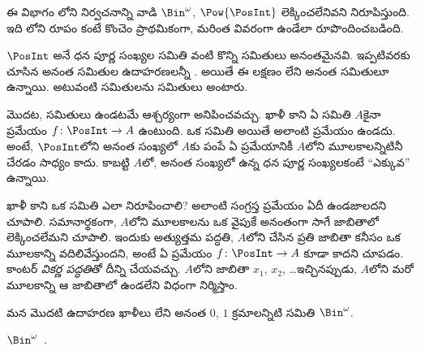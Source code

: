 \documentclass[../../../include/open-logic-section]{subfiles}
\begin{document}


\begin{editorial}
  ఈ విభాగం లోని నిర్వచనాన్ని వాడి $\Bin^\omega$,
  $\Pow{\PosInt}$ లెక్కించలేనివని నిరూపిస్తుంది. ఇది
  లోని రూపం కంటే కొంచెం ప్రాథమికంగా, మరింత
  వివరంగా ఉండేలా రూపొందించబడింది.
\end{editorial}

$\PosInt$ అనే ధన పూర్ణ సంఖ్యల సమితి వంటి కొన్ని సమితులు అనంతమైనవి.
ఇప్పటివరకు చూసిన అనంత సమితుల ఉదాహరణలన్నీ . అయితే ఈ
లక్షణం లేని అనంత సమితులూ ఉన్నాయి. అటువంటి సమితులను
\emph{} సమితులు అంటారు.

మొదట,  సమితులు ఉండటమే ఆశ్చర్యంగా అనిపించవచ్చు.
ఖాళీ కాని ఏ  సమితి $A$కైనా  ప్రమేయం
$f \colon \PosInt \to A$ ఉంటుంది. ఒక సమితి  అయితే
అలాంటి ప్రమేయం ఉండదు. అంటే, $\PosInt$లోని అనంత సంఖ్యలో
 $A$కు పంపే ఏ ప్రమేయానికీ $A$లోని మూలకాలన్నిటినీ చేరడం సాధ్యం కాదు.
కాబట్టి $A$లో, అనంత సంఖ్యలో ఉన్న ధన పూర్ణ సంఖ్యలకంటే ``ఎక్కువ''
 ఉన్నాయి.

ఖాళీ కాని ఒక సమితి  ఎలా నిరూపించాలి? అలాంటి సంగ్రస్త
ప్రమేయం ఏదీ ఉండజాలదని చూపాలి. సమానార్థకంగా, $A$లోని మూలకాలను ఒక
వైపుకే అనంతంగా సాగే జాబితాలో లెక్కించలేమని చూపాలి. ఇందుకు అత్యుత్తమ
పద్ధతి, $A$లోని  చేసిన ప్రతి జాబితా కనీసం ఒక మూలకాన్ని
వదిలివేస్తుందని, అంటే ఏ ప్రమేయం $f\colon \PosInt \to A$ కూడా
 కాదని చూపడం. కాంటర్ \emph{వికర్ణ పద్ధతి}తో దీన్ని
చేయవచ్చు. $A$లోని  జాబితా $x_1$, $x_2$, \dots ఇచ్చినప్పుడు,
$A$లోని మరో మూలకాన్ని ఆ జాబితాలో ఉండలేని విధంగా నిర్మిస్తాం.

మన మొదటి ఉదాహరణ ఖాళీలు లేని అనంత $0$, $1$ క్రమాలన్నిటి సమితి
$\Bin^\omega$.

\begin{thm}
$\Bin^\omega$~.
\end{thm}
\end{document}
